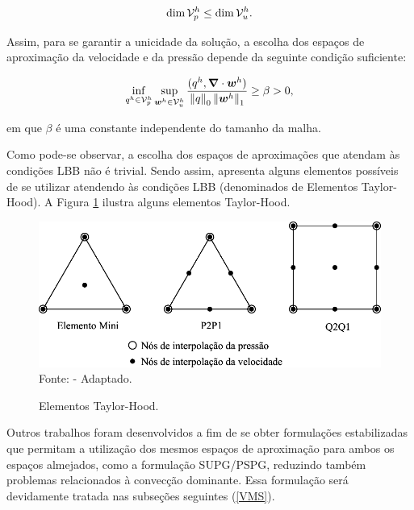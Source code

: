 \begin{equation}
    \dim{\mathcal{V}_p^h}\leq\dim{\mathcal{V}_u^h}\text{.}
\end{equation}

Assim, para se garantir a unicidade da solução, a escolha dos espaços de aproximação da velocidade e da pressão depende da seguinte condição suficiente:

\begin{equation}
    \inf_{q^h\in\mathcal{V}_p^h}{\sup_{\boldsymbol{w}^h\in\mathcal{V}_u^h}{\frac{(q^h,\boldsymbol{\nabla}\cdot\boldsymbol{w}^h)}{\left\lVert{q}\right\lVert_0\left\lVert{\boldsymbol{w}^h}\right\lVert_1}}}\geq\beta>0\text{,}
\end{equation}

\noindent em que $\beta$ é uma constante independente do tamanho da malha.

Como pode-se observar, a escolha dos espaços de aproximações que atendam às condições LBB não é trivial. Sendo assim,  apresenta alguns elementos possíveis de se utilizar atendendo às condições LBB (denominados de Elementos Taylor-Hood). A Figura \ref{fig:Taylor-Hood} ilustra alguns elementos Taylor-Hood.

\begin{figure}[h!]
    \centering
    \caption{Elementos Taylor-Hood.}
    \includegraphics[width=.65\linewidth]{Figuras/Taylor-Hood.pdf}
    \\Fonte:  - Adaptado.
    \label{fig:Taylor-Hood}
\end{figure}

Outros trabalhos foram desenvolvidos a fim de se obter formulações estabilizadas que permitam a utilização dos mesmos espaços de aproximação para ambos os espaços almejados, como a formulação SUPG/PSPG, reduzindo também problemas relacionados à convecção dominante. Essa formulação será devidamente tratada nas subseções seguintes (\ref{VMS}).